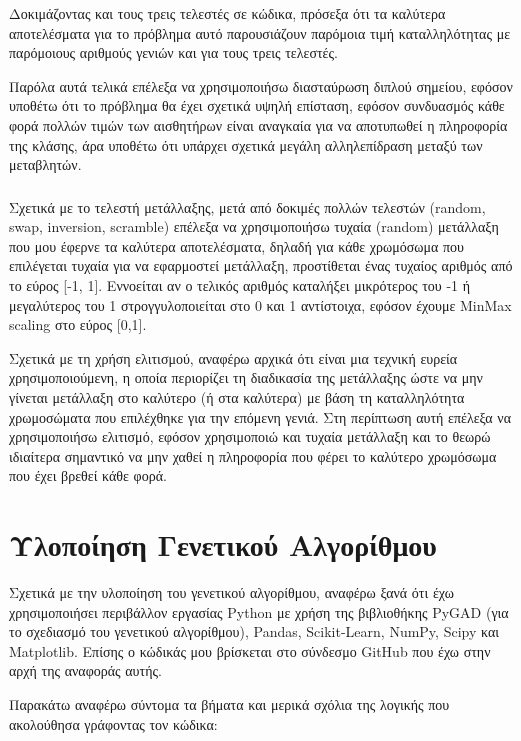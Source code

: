 \documentclass[12pt,a4paper]{article}
\begin{document}
Δοκιμάζοντας και τους τρεις τελεστές σε κώδικα, πρόσεξα ότι τα καλύτερα αποτελέσματα για το πρόβλημα αυτό παρουσιάζουν παρόμοια τιμή καταλληλότητας με παρόμοιους αριθμούς γενιών και για τους τρεις τελεστές.

Παρόλα αυτά τελικά επέλεξα να χρησιμοποιήσω διασταύρωση διπλού σημείου, εφόσον υποθέτω ότι το πρόβλημα θα έχει σχετικά υψηλή επίσταση, εφόσον συνδυασμός κάθε φορά πολλών τιμών των αισθητήρων είναι αναγκαία για να αποτυπωθεί η πληροφορία της κλάσης, άρα υποθέτω ότι υπάρχει σχετικά μεγάλη αλληλεπίδραση μεταξύ των μεταβλητών.

\subsubsection{}

Σχετικά με το τελεστή μετάλλαξης, μετά από δοκιμές πολλών τελεστών (random, swap, inversion, scramble) επέλεξα να χρησιμοποιήσω τυχαία (random) μετάλλαξη που μου έφερνε τα καλύτερα αποτελέσματα, δηλαδή για κάθε χρωμόσωμα που επιλέγεται τυχαία για να εφαρμοστεί μετάλλαξη, προστίθεται ένας τυχαίος αριθμός από το εύρος [-1, 1]. Εννοείται αν ο τελικός αριθμός καταλήξει μικρότερος του -1 ή μεγαλύτερος του 1 στρογγυλοποιείται στο 0 και 1 αντίστοιχα, εφόσον έχουμε MinMax scaling στο εύρος [0,1].

Σχετικά με τη χρήση ελιτισμού, αναφέρω αρχικά ότι είναι μια τεχνική ευρεία χρησιμοποιούμενη, η οποία περιορίζει τη διαδικασία της μετάλλαξης ώστε να μην γίνεται μετάλλαξη στο καλύτερο (ή στα καλύτερα) με βάση τη καταλληλότητα χρωμοσώματα που επιλέχθηκε για την επόμενη γενιά. Στη περίπτωση αυτή επέλεξα να χρησιμοποιήσω ελιτισμό, εφόσον χρησιμοποιώ και τυχαία μετάλλαξη και το θεωρώ ιδιαίτερα σημαντικό να μην χαθεί η πληροφορία που φέρει το καλύτερο χρωμόσωμα που έχει βρεθεί κάθε φορά.

\section{Υλοποίηση Γενετικού Αλγορίθμου}

Σχετικά με την υλοποίηση του γενετικού αλγορίθμου, αναφέρω ξανά ότι έχω χρησιμοποιήσει περιβάλλον εργασίας Python με χρήση της βιβλιοθήκης PyGAD (για το σχεδιασμό του γενετικού αλγορίθμου), Pandas, Scikit-Learn, NumPy, Scipy και Matplotlib. Επίσης ο κώδικάς μου βρίσκεται στο σύνδεσμο GitHub που έχω στην αρχή της αναφοράς αυτής.

Παρακάτω αναφέρω σύντομα τα βήματα και μερικά σχόλια της λογικής που ακολούθησα γράφοντας τον κώδικα:
\end{document}
